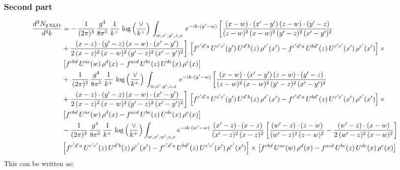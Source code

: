 \documentclass[9pt]{article}
\numberwithin{equation}{section}
\begin{document}
\subsubsection{Second part}
\begin{align}
 \frac{d^{3}N_{2\,\rm NLO}}{d^{3}k} & =    -\, \frac{1}{(2\pi)^{3}}\,\frac{g^{4}}{8\pi^{5}}\,\frac{1}{k^{+}}\,\log{\left(\frac{\vee}{k^{+}}\right)}\,\int_{w,x',y',z,x}\, e^{-ik\cdot (y'-w)}\,\bigg[\frac{(x-w)\cdot (x'-y')\,(z-w)\cdot (y'-z)}{(z-w)^{2}\,(x-w)^{2}\,(y'-z)^{2}\,(x'-y')^{2}}\notag \\ & +\frac{(x-z)\cdot (y'-z)\,(x-w)\cdot (x'-y')}{2\,(x-z)^{2}\,(x-w)^{2}\,(y'-z)^{2}\,(x'-y')^{2}}\bigg]\, \left[f^{c'd'a}\,U^{e'c'}(y')\,U^{d'b}(z)\,\rho^{e'}(x')-f^{c'd'a}\, 
    U^{bd'}(z)\,U^{c'e'}(x')\,\rho^{e'}(x')\right]\times\notag \\ &  \left[f^{cbd}\,U^{ac}(w)\,\rho^{d}(x) -f^{acd}\,U^{bc}(z)\,U^{de}(x)\,\rho^{e}(x)\right] \notag \\
&   +\, \frac{1}{(2\pi)^{3}}\,\frac{g^{4}}{8\pi^{5}}\,\frac{1}{k^{+}}\,\log{\left(\frac{\vee}{k^{+}}\right)}\,\int_{w,x',y',z,x}\, e^{-ik\cdot (y'-w)}\,\bigg[\frac{(x-w)\cdot (x'-y')\,(z-w)\cdot (y'-z)}{(z-w)^{2}\,(x-w)^{2}\,(y'-z)^{2}\,(x'-y')^{2}}\notag \\ &   +\frac{(x-z)\cdot (y'-z)\,(x-w)\cdot (x'-y')}{2\,(x-z)^{2}\,(x-w)^{2}\,(y'-z)^{2}\,(x'-y')^{2}}\bigg]\, \left[f^{c'd'a}\,U^{e'c'}(y')\,U^{d'b}(z)\,\rho^{e'}(x')-f^{c'd'a}\, 
    U^{bd'}(z)\,U^{c'e'}(x')\,\rho^{e'}(x')\right]\times\notag \\ &    \left[f^{cbd}\,U^{ac}(w)\,\rho^{d}(x) -f^{acd}\,U^{bc}(z)\,U^{de}(x)\,\rho^{e}(x)\right] \notag \\
&   -\frac{1}{(2\pi)^{3}}\,\frac{g^{4}}{8\pi^{5}}\,\frac{1}{k^{+}}\,\log{\left(\frac{\vee}{k^{+}}\right)}\int_{w,x',w',z,x} e^{-ik\cdot (w'-w)}\,\frac{(x'-z)\cdot (x-z)}{(x'-z)^{2}\,(x-z)^{2}}\,\bigg[\frac{(w'-z)\cdot (z-w)}{(w'-z)^{2}\,(z-w)^{2}}-\frac{(w'-z)\cdot (x-w)}{2\,(w'-z)^{2}\,(x-w)^{2}}\bigg]\notag \\
&   \left[f^{c'd'a}\,U^{e'c'}(z)\,U^{d'b}(z)\,\rho^{e'}(x')-f^{c'd'a}\, U^{bd'}(z)\,U^{c'e'}(x')\,\rho^{e'}(x')\right] \times\left[f^{cbd}\,U^{ac}(w)\,\rho^{d}(x) -f^{acd}\,U^{bc}(z)\,U^{de}(x)\,\rho^{e}(x)\right]
\end{align}
This can be written as:
\end{document}
